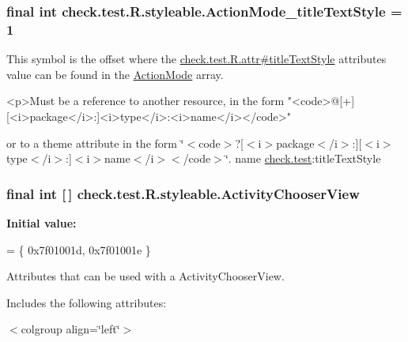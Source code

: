 \subsubsection[{Action\+Mode\+\_\+title\+Text\+Style}]{\setlength{\rightskip}{0pt plus 5cm}final int check.\+test.\+R.\+styleable.\+Action\+Mode\+\_\+title\+Text\+Style = 1\hspace{0.3cm}{\ttfamily [static]}}\label{classcheck_1_1test_1_1_r_1_1styleable_a16a980c21195919de6d38329e1f52a7a}
This symbol is the offset where the \hyperlink{classcheck_1_1test_1_1_r_1_1attr_a3132c1db5fe53bffcbde427849ea7bc8}{check.\+test.\+R.\+attr\#title\+Text\+Style} attribute\textquotesingle{}s value can be found in the \hyperlink{classcheck_1_1test_1_1_r_1_1styleable_a06d2fd2de1e471a432f3e49eea7b8015}{Action\+Mode} array.

\begin{DoxyVerb}      <p>Must be a reference to another resource, in the form "<code>@[+][<i>package</i>:]<i>type</i>:<i>name</i></code>"
\end{DoxyVerb}
 or to a theme attribute in the form \char`\"{}$<$code$>$?\mbox{[}$<$i$>$package$<$/i$>$\+:\mbox{]}\mbox{[}$<$i$>$type$<$/i$>$\+:\mbox{]}$<$i$>$name$<$/i$>$$<$/code$>$\char`\"{}.  name \hyperlink{namespacecheck_1_1test}{check.\+test}\+:title\+Text\+Style \hypertarget{classcheck_1_1test_1_1_r_1_1styleable_af1c3794ed9efe3a08ba4e2366f7961d3}{}
\subsubsection[{Activity\+Chooser\+View}]{\setlength{\rightskip}{0pt plus 5cm}final int \mbox{[}$\,$\mbox{]} check.\+test.\+R.\+styleable.\+Activity\+Chooser\+View\hspace{0.3cm}{\ttfamily [static]}}\label{classcheck_1_1test_1_1_r_1_1styleable_af1c3794ed9efe3a08ba4e2366f7961d3}
{\bfseries Initial value\+:}
\begin{DoxyCode}
= \{
            0x7f01001d, 0x7f01001e
        \}
\end{DoxyCode}
Attributes that can be used with a Activity\+Chooser\+View. 

Includes the following attributes\+:

\begin{TabularC}{0}
\hline
\end{TabularC}
$<$colgroup align=\char`\"{}left\char`\"{}$>$ 

